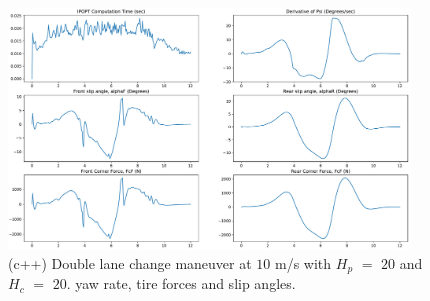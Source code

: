 \documentclass[12pt]{article}
\begin{document}
\begin{figure}[!hb]
	\centering
	\includegraphics[width=0.95\textwidth,keepaspectratio]{images/Double_Lane_Change_Maneuver_cpp_02.pdf}
	\caption{(c++) Double lane change maneuver at $10$ m/s with $H_p$ $=$ $20$ and $H_c$ $=$ $20$. yaw rate, tire forces and slip angles.}
	\label{fig_11:double_lane_change_maneuver_02}
\end{figure}

\clearpage


\clearpage
\end{document}
